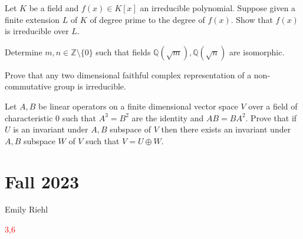 \documentclass[openany]{book}
\begin{document}
\begin{prob}
    Let \( K \) be a field and \( f(x) \in K[x] \) an irreducible polynomial. Suppose given a finite extension \( L \) of \( K \) of degree prime to the degree of \( f(x) \). Show that \( f(x) \) is irreducible over \( L \).
\end{prob}



\begin{prob}
    Determine \( m, n \in \mathbb{Z} \setminus \{0\} \) such that fields \( \mathbb{Q}(\sqrt{m}), \mathbb{Q}(\sqrt{n}) \) are isomorphic.
\end{prob}




\begin{prob}
    Prove that any two dimensional faithful complex representation of a non-commutative group is irreducible.
\end{prob}




\begin{prob}
    Let \( A, B \) be linear operators on a finite dimensional vector space \( V \) over a field of characteristic 0 such that \( A^3 = B^2 \) are the identity and \( AB = BA^2 \). Prove that if \( U \) is an invariant under \( A, B \) subspace of \( V \) then there exists an invariant under \( A, B \) subspace \( W \) of \( V \) such that \( V = U \oplus W \).
\end{prob}



\chapter{Fall 2023}

Emily Riehl

\textcolor{red}{3,6}
\end{document}
